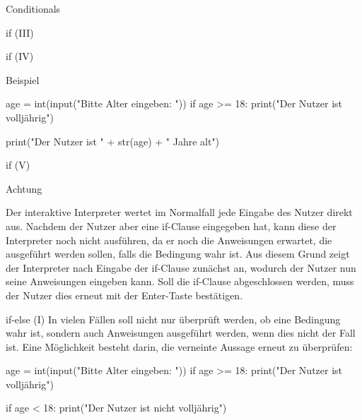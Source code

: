 \begin{subsection}{Conditionals}
\begin{frame}[fragile]{if (III)}
        \end{frame}
        
        \begin{frame}[fragile]{if (IV)}
            
            \begin{exampleblock}{Beispiel}
            
\begin{pythoncode}
age = int(input("Bitte Alter eingeben: "))
if age >= 18:
    print("Der Nutzer ist volljährig")

print("Der Nutzer ist " + str(age) + " Jahre alt")
\end{pythoncode}

            \end{exampleblock}
        \end{frame}
        
        \begin{frame}[fragile]{if (V)}
            
            \begin{alertblock}{Achtung}
            
                Der interaktive Interpreter wertet im Normalfall jede Eingabe des Nutzer direkt aus. Nachdem der Nutzer aber eine if-Clause eingegeben hat, kann diese der Interpreter noch nicht ausführen, da er noch die Anweisungen erwartet, die ausgeführt werden sollen, falls die Bedingung wahr ist. Aus diesem Grund zeigt der Interpreter nach Eingabe der if-Clause zunächst  an, wodurch der Nutzer nun seine Anweisungen eingeben kann. Soll die if-Clause abgeschlossen werden, muss der Nutzer dies erneut mit der Enter-Taste bestätigen.

            \end{alertblock}
        \end{frame}
        
        \begin{frame}[fragile]{if-else (I)}
            In vielen Fällen soll nicht nur überprüft werden, ob eine Bedingung wahr ist, sondern auch Anweisungen ausgeführt werden, wenn dies nicht der Fall ist. Eine Möglichkeit besteht darin, die verneinte Aussage erneut zu überprüfen:
            
\begin{pythoncode}
age = int(input("Bitte Alter eingeben: "))
if age >= 18:
    print("Der Nutzer ist volljährig")

if age < 18:
    print("Der Nutzer ist nicht volljährig")
\end{pythoncode}


\end{frame}
\end{subsection}

